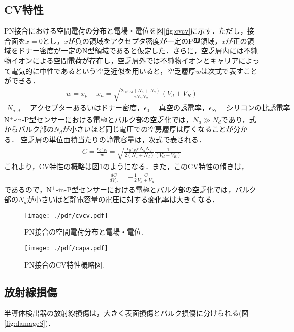 \subsection{CV特性}
\label{sub:cv}
PN接合における空間電荷の分布と電場・電位を図\ref{fig:cvcv}に示す．ただし，接合面を$x=0$とし，$x$が負の領域をアクセプタ密度が一定のP型領域，$x$が正の領域をドナー密度が一定のN型領域であると仮定した．さらに，空乏層内には不純物イオンによる空間電荷が存在し，空乏層外では不純物イオンとキャリアによって電気的に中性であるという空乏近似を用いると，空乏層厚$w$は次式で表すことができる．
\begin{eqnarray*}
w=x_{p}+x_{n}=\sqrt{\frac{2\epsilon_{0}\epsilon_{Si}(N_{a}+N_{d})}{eN_{a}N_{d}}(V_{d}+V_{R})}
\end{eqnarray*}
\begin{eqnarray*}
N_{a,d}=アクセプターあるいはドナー密度，\epsilon_{0}=真空の誘電率，\epsilon_{Si}=シリコンの比誘電率
\end{eqnarray*}
N$^{+}$-in-P型センサーにおける電極とバルク部の空乏化では，$N_{a}\gg N_{d}$であり，式からバルク部の$N_{d}$が小さいほど同じ電圧での空房層厚は厚くなることが分かる．
空乏層の単位面積当たりの静電容量は，次式で表される．
\begin{eqnarray*}
C=\frac{\epsilon_{0}\epsilon_{Si}}{w}=\sqrt{\frac{\epsilon_{0}\epsilon_{Si}eN_{a}N_{d}}{2(N_{a}+N_{d})}\frac{1}{(V_{d}+V_{R})}}
\end{eqnarray*}
これより，CV特性の概略は図\ref{fig:cvcvcv}のようになる．また，このCV特性の傾きは，
\begin{eqnarray*}
\frac{dC}{dV_{R}}=-\frac{1}{2}\frac{C}{V_{d}+V_{R}}
\end{eqnarray*}
であるので，N$^{+}$-in-P型センサーにおける電極とバルク部の空乏化では，バルク部の$N_{d}$が小さいほど静電容量の電圧に対する変化率は大きくなる．
\begin{figure}[h]
\begin{minipage}[b]{0.6\hsize}
	\centering
	\texttt{[image: ./pdf/cvcv.pdf]}
	\caption{PN接合の空間電荷分布と電場・電位.}
	\label{fig:cvcv}
\end{minipage}
\begin{minipage}[b]{0.4\hsize}
	\centering
	\texttt{[image: ./pdf/capa.pdf]}
	\caption{PN接合のCV特性概略図.}
	\label{fig:cvcvcv}
\end{minipage}
\end{figure}
\subsection{放射線損傷}
\label{sub:damage}
半導体検出器の放射線損傷は，大きく表面損傷とバルク損傷に分けられる(図\ref{fig:damageS})．
